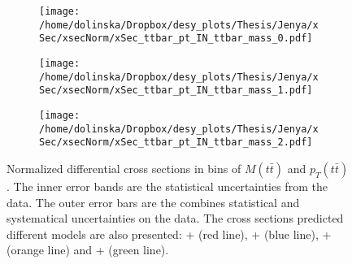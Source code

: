 \begin{figure}[p]
\centering
\begin{subfigure}
  \centering
  \texttt{[image: /home/dolinska/Dropbox/desy\_plots/Thesis/Jenya/xSec/xsecNorm/xSec\_ttbar\_pt\_IN\_ttbar\_mass\_0.pdf]}
\end{subfigure}
\begin{subfigure}
  \centering
  \texttt{[image: /home/dolinska/Dropbox/desy\_plots/Thesis/Jenya/xSec/xsecNorm/xSec\_ttbar\_pt\_IN\_ttbar\_mass\_1.pdf]}
\end{subfigure}
\begin{subfigure}
  \centering
  \texttt{[image: /home/dolinska/Dropbox/desy\_plots/Thesis/Jenya/xSec/xsecNorm/xSec\_ttbar\_pt\_IN\_ttbar\_mass\_2.pdf]}
\end{subfigure}
\caption{Normalized differential cross sections in bins of $M(t\bar{t})$ and $p_{T}(t\bar{t})$. The inner error bands are the statistical uncertainties from the data.
         The outer error bars are the combines statistical and systematical uncertainties on the data. The cross sections predicted different models are also presented:
         \MG + \PYTHIA (red line), \Powheg + \PYTHIA (blue line), \Powheg + \HERWIG (orange line) and \MCNLO + \HERWIG (green line).}
\label{fig:XS_2D_Mtt_pttt}
\end{figure}


